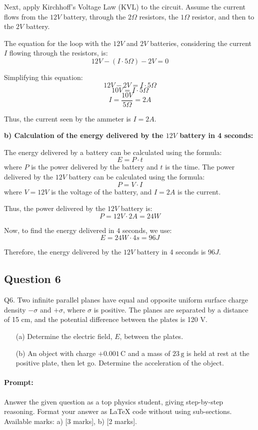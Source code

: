 \documentclass{article}
\begin{document}
Next, apply Kirchhoff’s Voltage Law (KVL) to the circuit. Assume the current flows from the $12V$ battery, through the $2\Omega$ resistors, the $1\Omega$ resistor, and then to the $2V$ battery. 

The equation for the loop with the $12V$ and $2V$ batteries, considering the current $I$ flowing through the resistors, is:
\[
12V - (I \cdot 5\Omega) - 2V = 0
\]

Simplifying this equation:
\[
12V - 2V = I \cdot 5\Omega
\]
\[
10V = I \cdot 5\Omega
\]
\[
I = \frac{10V}{5\Omega} = 2A
\]

Thus, the current seen by the ammeter is $I = 2A$.

\textbf{b) Calculation of the energy delivered by the $12V$ battery in 4 seconds:}

The energy delivered by a battery can be calculated using the formula:
\[
E = P \cdot t
\]
where $P$ is the power delivered by the battery and $t$ is the time. The power delivered by the $12V$ battery can be calculated using the formula:
\[
P = V \cdot I
\]
where $V = 12V$ is the voltage of the battery, and $I = 2A$ is the current.

Thus, the power delivered by the $12V$ battery is:
\[
P = 12V \cdot 2A = 24W
\]

Now, to find the energy delivered in $4$ seconds, we use:
\[
E = 24W \cdot 4s = 96J
\]

Therefore, the energy delivered by the $12V$ battery in 4 seconds is $96J$.


\subsection{Question 6}
Q6. Two infinite parallel planes have equal and opposite uniform surface charge density $-\sigma$ and $+\sigma$, where $\sigma$ is positive. The planes are separated by a distance of 15 cm, and the potential difference between the plates is 120 V.

\begin{enumerate}
    \item[(a)] Determine the electric field, $E$, between the plates.
    \item[(b)] An object with charge $+0.001 \, \text{C}$ and a mass of $23 \, \text{g}$ is held at rest at the positive plate, then let go. Determine the acceleration of the object.
\end{enumerate}


\paragraph{Prompt: \\} 
Answer the given question as a top physics student, giving step-by-step reasoning. Format your answer as LaTeX code without using sub-sections. Available marks: a) [3 marks], b) [2 marks].
\end{document}
